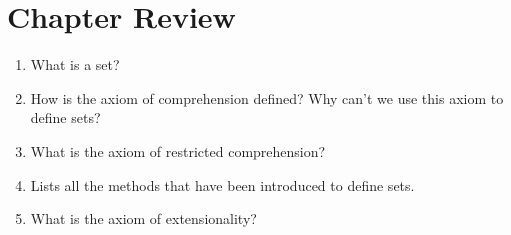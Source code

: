 \section{Chapter Review}
\begin{enumerate}
\item What is a set?
\item How is the axiom of comprehension defined?  Why can't we use this axiom to define sets?
\item What is the axiom of restricted comprehension?
\item Lists all the methods that have been introduced to define sets.
\item What is the axiom of extensionality?
\end{enumerate}

